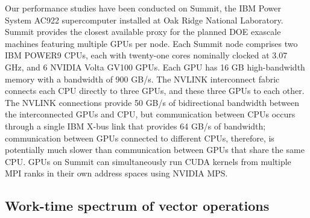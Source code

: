\documentclass[5p,times]{elsarticle}
\begin{document}


Our performance studies have been conducted on Summit, the IBM Power
System AC922 supercomputer installed at Oak Ridge National Laboratory. 
Summit provides the closest available proxy for the planned %
DOE exascale machines featuring multiple GPUs per node. Each
Summit node comprises two IBM POWER9 CPUs, each with twenty-one cores
nominally clocked at 3.07 GHz, and 6 NVIDIA Volta GV100 GPUs. Each GPU has 
16 GB high-bandwidth memory with a bandwidth of 900 GB/s.
The NVLINK
interconnect fabric connects each CPU directly to three GPUs, and these
three GPUs to each other. The NVLINK connections provide 50 GB/s of
bidirectional bandwidth between the interconnected GPUs and CPU, but
communication between CPUs occurs through a single IBM X-bus link that provides
64 GB/s of bandwidth; communication between GPUs connected to different CPUs,
therefore, is potentially much slower than communication between GPUs that share
the same CPU. GPUs on Summit can simultaneously run CUDA kernels from multiple MPI ranks
in their own address spaces using NVIDIA MPS. %

\subsection{Work-time spectrum of vector operations}
\label{sec:basic_vector_ops}
\end{document}
